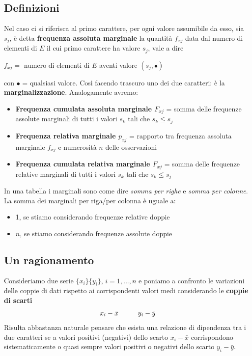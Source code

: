 \subsection{Definizioni}
Nel caso ci si riferisca al primo carattere, per ogni valore assumibile da esso, sia $s_j$, è detta \textbf{frequenza assoluta marginale} la quantità $f_{xj}$ data dal numero di elementi di $E$ il cui primo carattere ha valore $s_j$, vale a dire
\begin{center}
	\( f_{xj} = \) numero di elementi di $E$ aventi valore \((s_j, \bullet) \)
\end{center}
con $\bullet$ = qualsiasi valore. \newline 
Così facendo trascuro uno dei due caratteri: è la \textbf{marginalizzazione}.\newline
Analogamente avremo:
\begin{itemize}
	\item \textbf{Frequenza cumulata assoluta marginale $F_{xj}$} = somma delle frequenze assolute marginali di tutti i valori $s_k$ tali che \(s_k \leq s_j \)
	\item \textbf{Frequenza relativa marginale $p_{xj}$} = rapporto tra frequenza assoluta marginale $f_{xj}$ e numerosità $n$ delle osservazioni
	\item \textbf{Frequenza cumulata relativa marginale $F_{xj}$} = somma delle frequenze relative marginali di tutti i valori $s_k$ tali che \(s_k \leq s_j \)
\end{itemize}
In una tabella i marginali sono come dire \textit{somma per righe} e \textit{somma per colonne}.
La somma dei marginali per riga/per colonna è uguale a:
\begin{itemize}
	\item 1, se stiamo considerando frequenze relative doppie
	\item $n$, se stiamo considerando frequenze assolute doppie
\end{itemize}

\subsection{Un ragionamento}
Consideriamo due serie $\{x_i\} \{y_i\}$, $i = 1, ..., n$ \newline
e poniamo a confronto le variazioni delle coppie di dati rispetto ai corrispondenti valori medi considerando le \textbf{coppie di scarti} 
\[x_i - \bar{x} \hspace{10mm} y_i - \bar{y} \]
Risulta abbastanza naturale pensare che esista una relazione di dipendenza tra i due caratteri se a valori positivi (negativi) dello scarto $x_i - \bar{x}$ corrispondono sistematicamente o quasi sempre valori positivi o negativi dello scarto $y_i - \bar{y}$.

